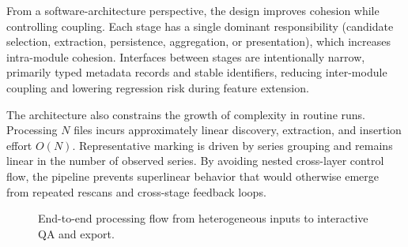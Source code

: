 From a software-architecture perspective, the design improves cohesion while controlling coupling. Each stage has a single dominant responsibility (candidate selection, extraction, persistence, aggregation, or presentation), which increases intra-module cohesion. Interfaces between stages are intentionally narrow, primarily typed metadata records and stable identifiers, reducing inter-module coupling and lowering regression risk during feature extension.

The architecture also constrains the growth of complexity in routine runs. Processing \(N\) files incurs approximately linear discovery, extraction, and insertion effort \(O(N)\). Representative marking is driven by series grouping and remains linear in the number of observed series. By avoiding nested cross-layer control flow, the pipeline prevents superlinear behavior that would otherwise emerge from repeated rescans and cross-stage feedback loops. 

\begin{figure}[htbp]
\centering
{}

\caption{End-to-end processing flow from heterogeneous inputs to interactive QA and export.}
\label{fig:architecture-flow}
\end{figure}

